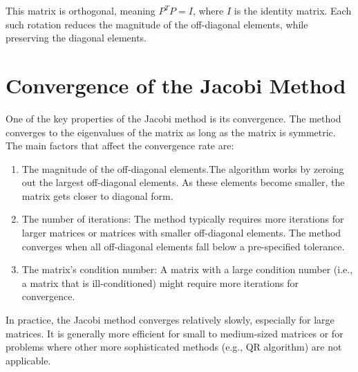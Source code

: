 \documentclass[journal]{IEEEtran}
\begin{document}
This matrix is orthogonal, meaning $P^T P = I$, where $I$ is the identity matrix. Each such rotation reduces the magnitude of the off-diagonal elements, while preserving the diagonal elements. 

\section{Convergence of the Jacobi Method}

One of the key properties of the Jacobi method is its convergence. The method converges to the eigenvalues of the matrix as long as the matrix is symmetric. The main factors that affect the convergence rate are:
\begin{enumerate}
    \item The magnitude of the off-diagonal elements.The algorithm works by zeroing out the largest off-diagonal elements. As these elements become smaller, the matrix gets closer to diagonal form.
    \item The number of iterations: The method typically requires more iterations for larger matrices or matrices with smaller off-diagonal elements. The method converges when all off-diagonal elements fall below a pre-specified tolerance.
    \item The matrix's condition number: A matrix with a large condition number (i.e., a matrix that is ill-conditioned) might require more iterations for convergence.
\end{enumerate}

In practice, the Jacobi method converges relatively slowly, especially for large matrices. It is generally more efficient for small to medium-sized matrices or for problems where other more sophisticated methods (e.g., QR algorithm) are not applicable.
\end{document}
